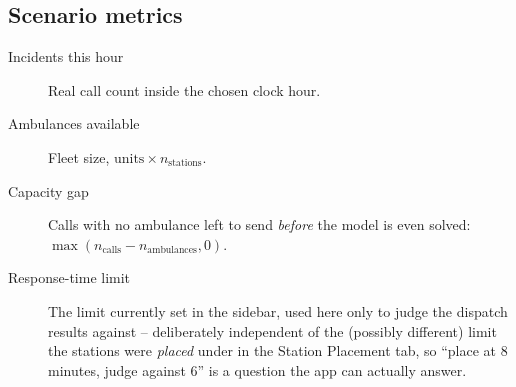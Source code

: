 \documentclass[11pt]{article}
\begin{document}
\subsection{Scenario metrics}
\begin{description}
  \item[Incidents this hour] Real call count inside the chosen clock hour.
  \item[Ambulances available] Fleet size, $\text{units}\times n_{\text{stations}}$.
  \item[Capacity gap] Calls with no ambulance left to send \emph{before} the
    model is even solved: $\max(n_{\text{calls}} - n_{\text{ambulances}}, 0)$.
  \item[Response-time limit] The limit currently set in the sidebar, used
    here only to judge the dispatch results against -- deliberately
    independent of the (possibly different) limit the stations were
    \emph{placed} under in the Station Placement tab, so ``place at 8
    minutes, judge against 6'' is a question the app can actually answer.
\end{description}
\end{document}

